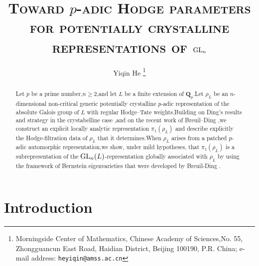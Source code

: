 \documentclass[10pt]{article}
\newcommand{\GLN}{{\rm GL}}
\newcommand{\bQ}{{\mathbf{Q}}}
\begin{document}
	
	
\title{\textbf{\textsc{Toward $p$-adic Hodge parameters for potentially crystalline representations of $\GLN_n$}}}


\author{Yiqin He
\thanks{Morningside Center of Mathematics, Chinese Academy of Sciences,\;No. 55, Zhongguancun East Road, Haidian District, Beijing 100190, P.R. China; e-mail address: \texttt{heyiqin@amss.ac.cn}
}}

\date{}
\maketitle


\begin{abstract}
Let $p$ be a prime number,\;$n\geq 2$,\;and let $L$ be a finite extension of $\bQ_p$.\;Let $\rho_L$ be an $n$-dimensional non-critical generic potentially crystalline $p$-adic representation of the absolute Galois group of $L$ with regular Hodge--Tate weights.\;Building on Ding's results and strategy in the crystabelline case \cite{ParaDing2024},\;and on the recent work of Breuil--Ding \cite{BDcritical25},\;we construct an explicit locally analytic representation $\pi_{1}(\rho_L)$ and describe explicitly the Hodge-filtration data of $\rho_L$ that it determines.\;When $\rho_L$ arises from a patched $p$-adic automorphic representation,\;we show, under mild hypotheses, that $\pi_{1}(\rho_L)$ is a subrepresentation of the $\GLN_n(L)$-representation globally associated with $\rho_L$ by using the framework of Bernstein eigenvarieties that were developed by Breuil-Ding \cite{Ding2021}. \;
\end{abstract}

	
{\hypersetup{linkcolor=black}
\tableofcontents}

	



\setlength{\baselineskip}{12pt}

\section{Introduction}
\end{document}
